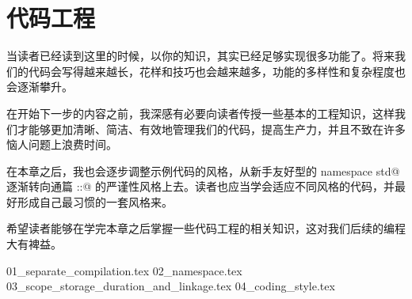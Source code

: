 \chapter{代码工程}
当读者已经读到这里的时候，以你的知识，其实已经足够实现很多功能了。将来我们的代码会写得越来越长，花样和技巧也会越来越多，功能的多样性和复杂程度也会逐渐攀升。\par
在开始下一步的内容之前，我深感有必要向读者传授一些基本的工程知识，这样我们才能够更加清晰、简洁、有效地管理我们的代码，提高生产力，并且不致在许多恼人问题上浪费时间。\par
在本章之后，我也会逐步调整示例代码的风格，从新手友好型的 \lstinline@using namespace std@ 逐渐转向通篇 \lstinline@std::@ 的严谨性风格上去。读者也应当学会适应不同风格的代码，并最好形成自己最习惯的一套风格来。\par
希望读者能够在学完本章之后掌握一些代码工程的相关知识，这对我们后续的编程大有裨益。\par
{01_separate_compilation.tex}
{02_namespace.tex}
{03_scope_storage_duration_and_linkage.tex}
{04_coding_style.tex}
